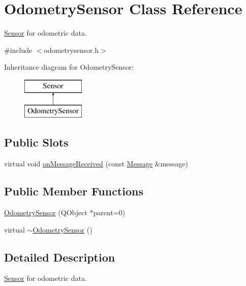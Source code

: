 \hypertarget{classOdometrySensor}{
\section{OdometrySensor Class Reference}
\label{classOdometrySensor}
}


\hyperlink{classSensor}{Sensor} for odometric data.  




{\ttfamily \#include $<$odometrysensor.h$>$}

Inheritance diagram for OdometrySensor:\begin{figure}[H]
\begin{center}
\leavevmode
\includegraphics[height=2.000000cm]{classOdometrySensor}
\end{center}
\end{figure}
\subsection*{Public Slots}
\begin{DoxyCompactItemize}
\item 
virtual void \hyperlink{classOdometrySensor_a31000cc77d015a52c4b9d43996ed6ae8}{onMessageReceived} (const \hyperlink{classMessage}{Message} \&message)
\end{DoxyCompactItemize}
\subsection*{Public Member Functions}
\begin{DoxyCompactItemize}
\item 
\hyperlink{classOdometrySensor_a437a9b96f46dd58fc93355404cdff683}{OdometrySensor} (QObject $\ast$parent=0)
\item 
virtual \hyperlink{classOdometrySensor_a6ad98746685f391390ae75f252c609e2}{$\sim$OdometrySensor} ()
\end{DoxyCompactItemize}


\subsection{Detailed Description}
\hyperlink{classSensor}{Sensor} for odometric data. 

